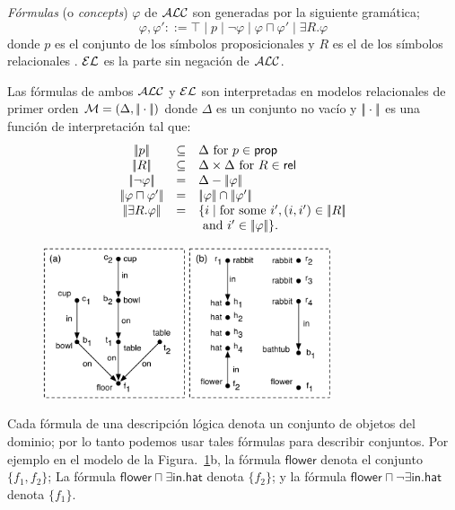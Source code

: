 \emph{F\'ormulas} (o \emph{concepts}) $\varphi$ de $\mathcal{ALC}$ son generadas por la siguiente gram\'atica;
$$
\varphi,\varphi' ::= \top \mid p \mid \neg \varphi \mid \varphi \sqcap \varphi'
\mid \exists R. \varphi
$$
donde $p$ es el conjunto de los s\'imbolos proposicionales \prop y $R$ es el de los s\'imbolos relacionales \rel. $\mathcal{EL}$ es la parte sin negaci\'on de $\mathcal{ALC}$.

Las f\'ormulas de ambos $\mathcal{ALC}$ y $\mathcal{EL}$ son interpretadas en modelos relacionales de primer orden $\mathcal{M} = (\Delta,|\!|\cdot|\!|)$ donde
$\Delta$ es un conjunto no vac\'io y $|\!|\cdot|\!|$ es una funci\'on de interpretaci\'on tal que:
$$
\begin{array}{ccl}
\interp{p} & \subseteq & \Delta  \mbox{ for $p \in \prop$}\\
\interp{R} & \subseteq & \Delta \times \Delta  \mbox{ for $R \in \rel$}\\
\interp{\neg \varphi} & = & \Delta - \interp{\varphi}\\
\interp{\varphi \sqcap \varphi'} & = & \interp{\varphi} \cap \interp{\varphi'}\\
\interp{\exists R.\varphi} & = & \{i \mid \mbox{for some } i', (i,i') \in \interp{R}\\
& & \mbox{ and } i' \in \interp{\varphi} \}.\\
\end{array}
$$

\begin{figure}[ht]
\begin{center}
\includegraphics[width=8.5cm]{figures/pic-dale-haddock.pdf}\\[0pt]
\caption{}
\label{fig:dale-haddock}
\end{center}
\end{figure}


Cada f\'ormula de una descripci\'on l\'ogica denota un conjunto de objetos del dominio; por lo tanto podemos usar tales f\'ormulas para describir conjuntos. Por ejemplo en el modelo de la Figura.~\ref{fig:dale-haddock}b, la f\'ormula
$\mathsf{flower}$ denota el conjunto $\{f_1,f_2\}$; La f\'ormula
$\mathsf{flower} \sqcap \exists \mathsf{in}.\mathsf{hat}$ denota
$\{f_2\}$; y la f\'ormula $\mathsf{flower} \sqcap \neg
\exists \mathsf{in}.\mathsf{hat}$ denota $\{f_1\}$.

